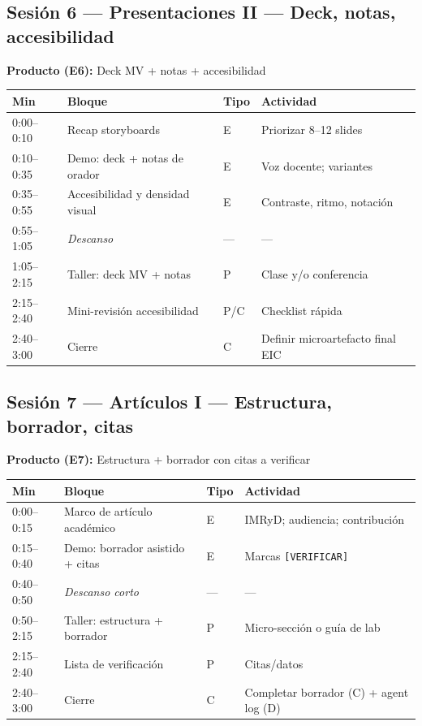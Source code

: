 \subsection{Sesión 6 --- Presentaciones II --- Deck, notas, accesibilidad}
\textbf{Producto (E6):} Deck MV + notas + accesibilidad

\begin{tabularx}{\textwidth}{@{}lllX@{}}
\toprule
Min & Bloque & Tipo & Actividad \\
\midrule
0:00--0:10 & Recap storyboards & E & Priorizar 8--12 slides \\
0:10--0:35 & Demo: deck + notas de orador & E & Voz docente; variantes \\
0:35--0:55 & Accesibilidad y densidad visual & E & Contraste, ritmo, notación \\
0:55--1:05 & \emph{Descanso} & --- & --- \\
1:05--2:15 & Taller: deck MV + notas & P & Clase y/o conferencia \\
2:15--2:40 & Mini-revisión accesibilidad & P/C & Checklist rápida \\
2:40--3:00 & Cierre & C & Definir microartefacto final EIC \\
\bottomrule
\end{tabularx}

\subsection{Sesión 7 --- Artículos I --- Estructura, borrador, citas}
\textbf{Producto (E7):} Estructura + borrador con citas a verificar

\begin{tabularx}{\textwidth}{@{}lllX@{}}
\toprule
Min & Bloque & Tipo & Actividad \\
\midrule
0:00--0:15 & Marco de artículo académico & E & IMRyD; audiencia; contribución \\
0:15--0:40 & Demo: borrador asistido + citas & E & Marcas \texttt{[VERIFICAR]} \\
0:40--0:50 & \emph{Descanso corto} & --- & --- \\
0:50--2:15 & Taller: estructura + borrador & P & Micro-sección o guía de lab \\
2:15--2:40 & Lista de verificación & P & Citas/datos \\
2:40--3:00 & Cierre & C & Completar borrador (C) + agent log (D) \\
\bottomrule
\end{tabularx}

